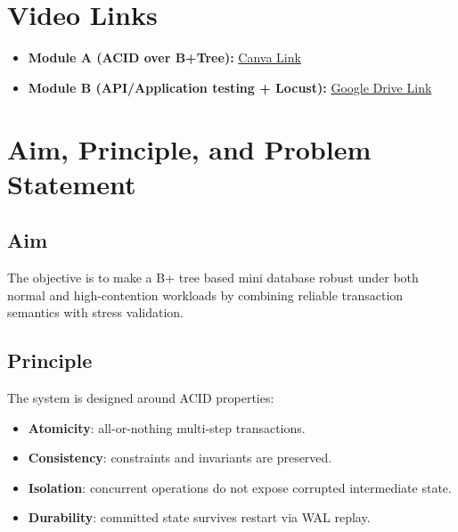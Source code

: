 \documentclass[12pt,a4paper]{article}
\begin{document}
\begin{titlepage}
\vfill
\begin{center}
\end{center}
\vspace{1cm}
\end{titlepage}

\setcounter{page}{1}

\tableofcontents
\newpage

\section*{Video Links}

\begin{itemize}[noitemsep]
  \item \textbf{Module A (ACID over B+Tree):} \href{https://canva.link/xhn5uioz093wiko}{Canva Link}
  \item \textbf{Module B (API/Application testing + Locust):} \href{https://drive.google.com/drive/folders/1JIU-ww6tLI8o2geELsPQ9wfkWjCJDl0t?usp=sharing}{Google Drive Link}
\end{itemize}

\section{Aim, Principle, and Problem Statement}

\subsection{Aim}
The objective is to make a B+ tree based mini database robust under both normal and high-contention workloads by combining reliable transaction semantics with stress validation.

\subsection{Principle}
The system is designed around ACID properties:
\begin{itemize}[noitemsep]
  \item \textbf{Atomicity}: all-or-nothing multi-step transactions.
  \item \textbf{Consistency}: constraints and invariants are preserved.
  \item \textbf{Isolation}: concurrent operations do not expose corrupted intermediate state.
  \item \textbf{Durability}: committed state survives restart via WAL replay.
\end{itemize}
\end{document}
